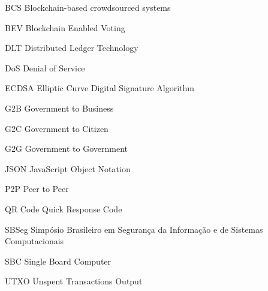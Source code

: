 
\begin{siglas}
  \item[BCS] Blockchain-based crowdsourced systems
  \item[BEV] Blockchain Enabled Voting
  \item[DLT] Distributed Ledger Technology
  \item[DoS] Denial of Service
  \item[ECDSA] Elliptic Curve Digital Signature Algorithm
  \item[G2B] Government to Business
  \item[G2C] Government to Citizen
  \item[G2G] Government to Government
  \item[JSON] JavaScript Object Notation
  \item[P2P] Peer to Peer
  \item[QR Code] Quick Response Code
  \item[SBSeg] Simpósio Brasileiro em Segurança da Informação e de Sistemas Computacionais
  \item[SBC] Single Board Computer
  \item[UTXO] Unspent Transactions Output
  
\end{siglas}